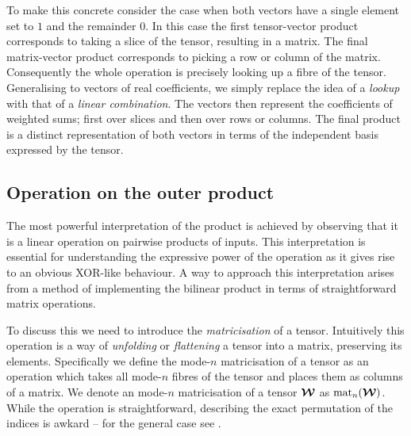 To make this concrete
consider the case when both vectors have a single element set to \(1\) and the remainder
\(0\). In this case the first tensor-vector product corresponds to taking a slice of the
tensor, resulting in a matrix. The final matrix-vector product corresponds to picking a
row or column of the matrix. Consequently the whole operation is precisely looking up
a fibre of the tensor. Generalising to vectors of real coefficients, we simply replace the idea of a
\emph{lookup} with that of a \emph{linear combination}. The vectors then represent the coefficients
of weighted sums; first over slices and then over rows or columns. The final product is a
distinct representation of both vectors in terms of the independent basis expressed by the tensor.

\subsection{Operation on the outer product}
The most powerful interpretation of the product is achieved by observing that it is
a linear operation on pairwise products of inputs.
This interpretation is essential for understanding the expressive
power of the operation as it gives rise to an obvious XOR-like behaviour.
A way to approach this interpretation arises from a method of implementing the bilinear 
product in terms of straightforward matrix operations.

To discuss
this we need to introduce the \emph{matricisation} of a tensor. Intuitively this
operation is a way of \emph{unfolding} or \emph{flattening} a tensor into a matrix,
preserving its elements. Specifically we define the mode-\(n\)
matricisation of a tensor as an operation which takes all mode-\(n\) fibres
of the tensor and places them as columns of a matrix. We denote an mode-\(n\)
matricisation of a tensor \(\bm{\mathcal{W}}\) as \(\operatorname{mat}_n(\bm{\mathcal{W}})\). While the operation is
straightforward, describing the exact permutation of the indices is awkard -- 
for the general case see
\autocite{Kolda2009}. 

